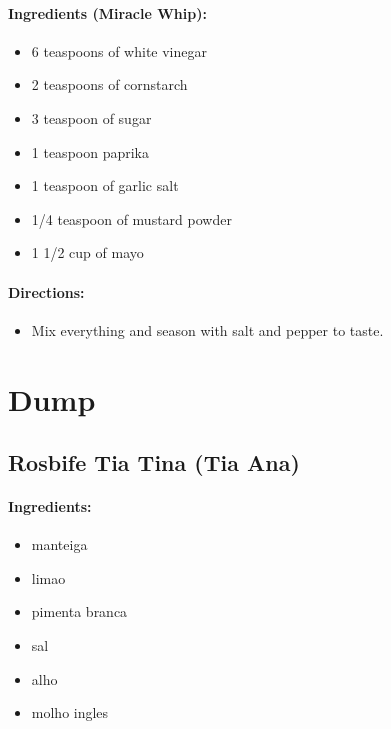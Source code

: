 \documentclass{article}
\begin{document}
\paragraph{Ingredients (Miracle Whip):}

\begin{itemize}
	\item 6 teaspoons of white vinegar 
	\item 2 teaspoons of cornstarch 
	\item 3 teaspoon of sugar 
	\item 1 teaspoon paprika 
	\item 1 teaspoon of garlic salt 
	\item 1/4 teaspoon of mustard powder 
	\item 1 1/2 cup of mayo
\end{itemize}

\paragraph{Directions:}
\begin{itemize}
	\item Mix everything and season with salt and pepper to taste.
\end{itemize}

\section{Dump}

\subsection{Rosbife Tia Tina (Tia Ana)}

\paragraph{Ingredients:}

\begin{itemize}
	\item manteiga
	\item limao
	\item pimenta branca
	\item sal
	\item alho
	\item molho ingles
\end{itemize}
\end{document}
